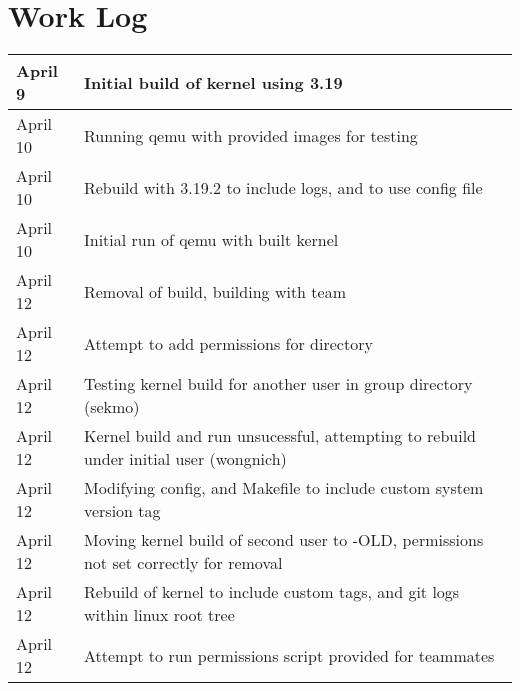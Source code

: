 \documentclass[onecolumn, draftclsnofoot,10pt, compsoc]{IEEEtran}
\begin{document}
\section{Work Log}
\begin{tabular}{|l|l|}
\hline
     April 9 & Initial build of kernel using 3.19\\\hline
     April 10 & Running qemu with provided images for testing\\\hline
     April 10 & Rebuild with 3.19.2 to include logs, and to use config file\\\hline
     April 10 & Initial run of qemu with built kernel\\\hline
     April 12 & Removal of build, building with team\\\hline
     April 12 & Attempt to add permissions for directory\\\hline
     April 12 & Testing kernel build for another user in group directory (sekmo)\\\hline
     April 12 & Kernel build and run unsucessful, attempting to rebuild under initial user (wongnich)\\\hline
     April 12 & Modifying config, and Makefile to include custom system version tag\\\hline
     April 12 & Moving kernel build of second user to -OLD, permissions not set correctly for removal\\\hline
     April 12 & Rebuild of kernel to include custom tags, and git logs within linux root tree\\\hline
     April 12 & Attempt to run permissions script provided for teammates\\\hline
\end{tabular}
\end{document}
